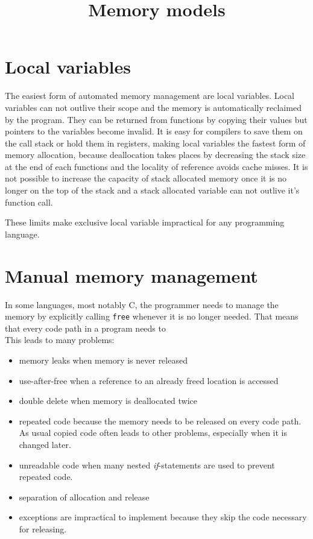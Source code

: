 \documentclass[conference,twocolumn]{IEEEtran}
\title{Memory models}
\begin{document}
	
\maketitle

\section{Local variables}
The easiest form of automated memory management are local variables. Local variables can not outlive their scope and the memory is automatically reclaimed by the program. They can be returned from functions by copying their values but pointers to the variables become invalid. It is easy for compilers to save them on the call stack or hold them in registers, making local variables the fastest form of memory allocation, because deallocation takes places by decreasing the stack size at the end of each functions and the locality of reference avoids cache misses. It is not possible to increase the capacity of stack allocated memory once it is no longer on the top of the stack and a stack allocated variable can not outlive it's function call.

These limits make exclusive local variable impractical for any programming language.


\section{Manual memory management}
In some languages, most notably C, the programmer needs to manage the memory by explicitly calling \verb|free| whenever it is no longer needed. That means that every code path in a program needs to  \\
This leads to many problems:
\begin{itemize}
    \item memory leaks when memory is never released
    \item use-after-free when a reference to an already freed location is accessed
    \item double delete when memory is deallocated twice
    \item repeated code because the memory needs to be released on every code path. As usual copied code often leads to other problems, especially when it is changed later.
    \item unreadable code when many nested \emph{if}-statements are used to prevent repeated code.
    \item separation of allocation and release
    \item exceptions are impractical to implement because they skip the code necessary for releasing.
\end{itemize}
\end{document}
